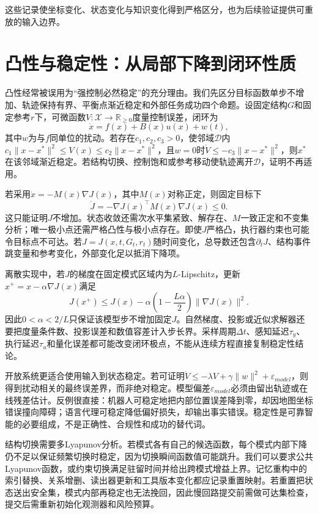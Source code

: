 这些记录使坐标变化、状态变化与知识变化得到严格区分，也为后续验证提供可重放的输入边界。

\section{凸性与稳定性：从局部下降到闭环性质}
\label{sec:section_2277}

凸性经常被误用为“强控制必然稳定”的充分理由。我们先区分目标函数单步不增加、轨迹保持有界、平衡点渐近稳定和外部任务成功四个命题。设固定结构$G$和固定参考$r$下，可微函数$V:\mathcal X\to\mathbb R_{\ge0}$度量控制误差，闭环为
\begin{equation}
\dot x=f(x)+B(x)u(x)+w(t),
\end{equation}
其中$w$为与$f$同单位的扰动。若存在$c_1,c_2,c_3>0$，使邻域$\mathcal D$内$c_1\|x-x^*\|^2\le V(x)\le c_2\|x-x^*\|^2$，且$w=0$时$\dot V\le-c_3\|x-x^*\|^2$，则$x^*$在该邻域渐近稳定。若结构切换、控制饱和或参考移动使轨迹离开$\mathcal D$，证明不再适用。

若采用$\dot x=-M(x)\nabla J(x)$，其中$M(x)$对称正定，则固定目标下
\begin{equation}
\dot J=-\nabla J(x)^\top M(x)\nabla J(x)\le0.
\end{equation}
这只能证明$J$不增加。状态收敛还需次水平集紧致、解存在、$M$一致正定和不变集分析；唯一极小点还需严格凸性与极小点存在。即使$J$严格凸，执行器约束也可能令目标点不可达。若$J=J(x,t,G_t,r_t)$随时间变化，总导数还包含$\partial_tJ$、结构事件跳变量和参考变化，外部变化足以抵消下降项。

离散实现中，若$J$的梯度在固定模式区域内为$L$-Lipschitz，更新$x^+=x-\alpha\nabla J(x)$满足
\begin{equation}
J(x^+)\le J(x)-\alpha\left(1-\frac{L\alpha}{2}\right)\|\nabla J(x)\|^2.
\end{equation}
因此$0<\alpha<2/L$只保证该模型步不增加固定$J$。自然梯度、投影或近似求解器还要把度量条件数、投影误差和数值容差计入步长界。采样周期$\Delta t$、感知延迟$\tau_y$、执行延迟$\tau_u$和量化误差都可能改变闭环极点，不能从连续方程直接复制稳定性结论。

开放系统更适合使用输入到状态稳定。若可证明$\dot V\le-\lambda V+\gamma\|w\|^2+\varepsilon_{model}$，则得到扰动相关的最终误差界，而非绝对稳定。模型偏差$\varepsilon_{model}$必须由留出轨迹或在线残差估计。反例很直接：机器人可稳定地把内部位置误差降到零，却因地图坐标错误撞向障碍；语言代理可稳定降低偏好损失，却输出事实错误。稳定性是可靠智能的必要组成，不是正确性、合规性和成功的替代词。

结构切换需要多Lyapunov分析。若模式各有自己的候选函数，每个模式内部下降仍不足以保证频繁切换时稳定，因为切换瞬间函数值可能跳升。我们可以要求公共Lyapunov函数，或约束切换满足驻留时间并给出跨模式增益上界。记忆重构中的索引替换、关系增删、读出器更新和工具版本变化都应记录重置映射。若重置把状态送出安全集，模式内部再稳定也无法挽回，因此慢回路提交前需做可达集检查，提交后需重新初始化观测器和风险预算。

